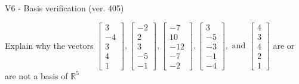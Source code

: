 \begin{exercise}
  \begin{exerciseTitle}V6 - Basis verification (ver. 405)\end{exerciseTitle}
  \begin{exerciseStatement}
    Explain why the vectors \(\left[\begin{array}{r}
3 \\
-4 \\
3 \\
4 \\
1
\end{array}\right] , \left[\begin{array}{r}
-2 \\
2 \\
3 \\
-5 \\
-1
\end{array}\right] , \left[\begin{array}{r}
-7 \\
10 \\
-12 \\
-7 \\
-2
\end{array}\right] , \left[\begin{array}{r}
3 \\
-5 \\
-3 \\
-1 \\
-4
\end{array}\right] , \text{ and } \left[\begin{array}{r}
4 \\
3 \\
4 \\
2 \\
1
\end{array}\right]\) are or are not a basis of \(\mathbb{R}^5\)	



\end{exerciseStatement}
\end{exercise}

